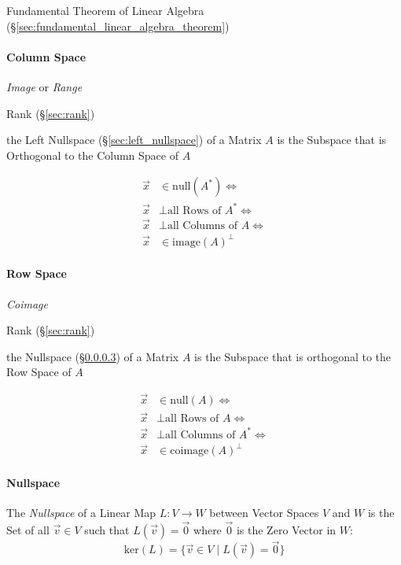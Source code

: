 \fist Fundamental Theorem of Linear Algebra
(\S\ref{sec:fundamental_linear_algebra_theorem})



\paragraph{Column Space}\label{sec:column_space}\hfill

\emph{Image} or \emph{Range}

Rank (\S\ref{sec:rank})

the Left Nullspace (\S\ref{sec:left_nullspace}) of a Matrix $A$ is the Subspace
that is Orthogonal to the Column Space of $A$

\begin{align*}
  \vec{x} & \in \mathrm{null}(A^*) \Leftrightarrow         \\
  \vec{x} & \bot \text{all Rows of }A^* \Leftrightarrow    \\
  \vec{x} & \bot \text{all Columns of }A \Leftrightarrow   \\
  \vec{x} & \in \mathrm{image}(A)^\bot
\end{align*}



\paragraph{Row Space}\label{sec:row_space}\hfill

\emph{Coimage}

Rank (\S\ref{sec:rank})

the Nullspace (\S\ref{sec:nullspace}) of a Matrix $A$ is the Subspace that is
orthogonal to the Row Space of $A$

\begin{align*}
  \vec{x} & \in \mathrm{null}(A) \Leftrightarrow         \\
  \vec{x} & \bot \text{all Rows of }A \Leftrightarrow    \\
  \vec{x} & \bot \text{all Columns of }A^* \Leftrightarrow   \\
  \vec{x} & \in \mathrm{coimage}(A)^\bot
\end{align*}



\paragraph{Nullspace}\label{sec:nullspace}\hfill

The \emph{Nullspace} of a Linear Map $L : V \rightarrow W$ between Vector
Spaces $V$ and $W$ is the Set of all $\vec{v}\in{V}$ such that $L(\vec{v}) =
\vec{0}$ where $\vec{0}$ is the Zero Vector in $W$:
\[
  \text{ker}(L) = \{\vec{v}\in{V} \;|\; L(\vec{v}) = \vec{0}\}
\]

